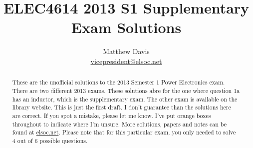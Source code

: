 \documentclass[a4paper]{article}
\title{ELEC4614 2013 S1 Supplementary Exam Solutions}
\author{Matthew Davis \\ \href{mailto:vicepresident@elsoc.net}{vicepresident@elsoc.net}}
\renewcommand\thesubsection{(\alph{subsection})}
\begin{document}
\maketitle

\begin{abstract}
    These are the unofficial solutions to the 2013 Semester 1 Power Electronics exam.
    There are two different 2013 exams. 
    These solutions abre for the one where question 1a has an inductor, which is the supplementary exam.
    The other exam is available on the library website.
    This is just the first draft. I don't guarantee than the solutions here are correct. If you spot a mistake, please let me know. I've put orange boxes throughout to indicate where I'm unsure.
    More solutions, papers and notes can be found at \href{www.elsoc.net}{elsoc.net}.
    Please note that for this particular exam, you only needed to solve 4 out of 6 possible questions.
\end{abstract}


\tableofcontents




\renewcommand\thesubsection{(\roman{subsection})}

\renewcommand\thesubsection{(\alph{subsection})}


\end{document}
